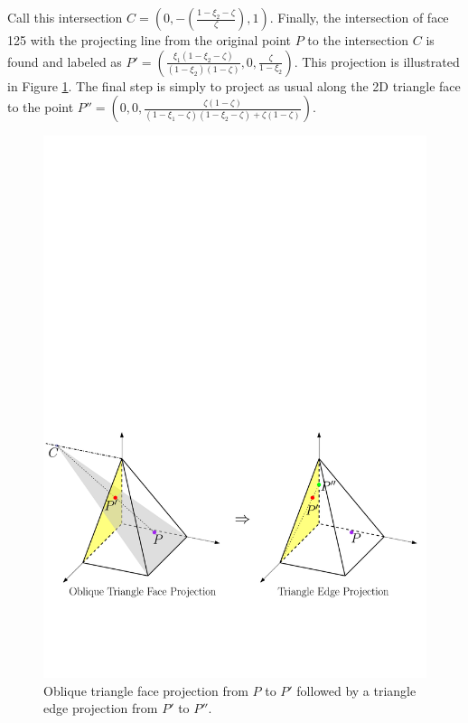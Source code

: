 Call this intersection $C=(0,-(\frac{1-\xi_2-\zeta}{\zeta}),1)$.
Finally, the intersection of face 125 with the projecting line from the original point $P$ to the intersection $C$ is found and labeled as $P'=(\frac{\xi_1(1-\xi_2-\zeta)}{(1-\xi_2)(1-\zeta)},0,\frac{\zeta}{1-\xi_2})$.
This projection is illustrated in Figure \ref{fig:PyramidProjectionObliqueTriangle}.
The final step is simply to project as usual along the 2D triangle face to the point $P''=(0,0,\frac{\zeta(1-\zeta)}{(1-\xi_1-\zeta)(1-\xi_2-\zeta)+\zeta(1-\zeta)})$.

\begin{figure}[!ht]
\begin{center}
\includegraphics[scale=0.6]{./figures/PyramidProjectionObliqueTriangle.pdf}
\caption{Oblique triangle face projection from $P$ to $P'$ followed by a triangle edge projection from $P'$ to $P''$.}
\label{fig:PyramidProjectionObliqueTriangle}
\end{center}
\end{figure}

